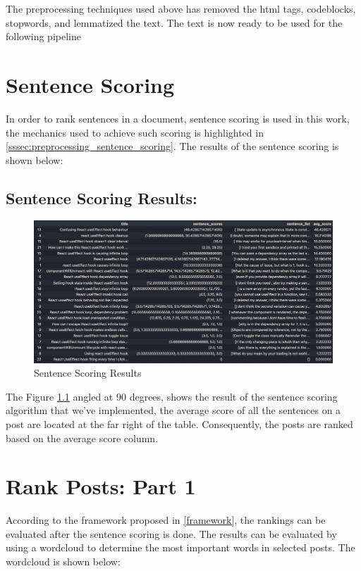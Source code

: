 The preprocessing techniques used above has removed the html tags, codeblocks, stopwords, and lemmatized the text. The text is now ready to be used for the following pipeline

\section{Sentence Scoring} \label{sentence-scoring_results}
In order to rank sentences in a document, sentence scoring is used in this work, the mechanics used to achieve such scoring is highlighted in \ref{sssec:preprocessing_sentence_scoring}. The results of the sentence scoring is shown below:

\subsection{Sentence Scoring Results:} \label{sentence-scoring_results_results}
\begin{figure}[H]
  \centering
  \includegraphics[scale=0.65, angle=90]{assets/sentence-scoring.png}
  \caption{Sentence Scoring Results}
  \label{fig:sentence-scoring}
\end{figure}

The Figure \ref{sentence-scoring_results_results} angled at 90 degrees, shows the result of the sentence scoring algorithm that we've implemented, the average score of all the sentences on a post are located at the far right of the table. Consequently, the posts are ranked based on the average score column.

\section{Rank Posts: Part 1} \label{rank-posts_1_results}
According to the framework proposed in \ref{framework}, the rankings can be evaluated after the sentence scoring is done. The results can be evaluated by using a wordcloud to determine the most important words in selected posts. The wordcloud is shown below:


